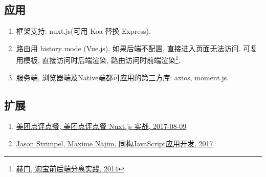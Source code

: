 \subsection{应用}\label{ux5e94ux7528}

\begin{enumerate}
\def\labelenumi{\arabic{enumi}.}
\tightlist
\item
  框架支持: nuxt.js(可用 Koa 替换 Express).
\item
  路由用 history mode (Vue.js), 如果后端不配置, 直接进入页面无法访问.
  可复用模板, 直接访问时后端渲染, 路由访问时前端渲染\footnote{\href{http://2014.jsconf.cn/slides/herman-taobaoweb/\#/}{赫门,
    淘宝前后端分离实践, 2014}}.
\item
  服务端, 浏览器端及Native端都可应用的第三方库: axios, moment.js.
\end{enumerate}

\subsection{扩展}\label{ux6269ux5c55}

\begin{enumerate}
\def\labelenumi{\arabic{enumi}.}
\tightlist
\item
  \href{https://juejin.im/post/598aabe96fb9a03c335a8dde}{美团点评点餐,
  美团点评点餐 Nuxt.js 实战, 2017-08-09}
\item
  \href{https://book.douban.com/subject/27183584/}{Jason Strimpel,
  Maxime Najim, 同构JavaScript应用开发, 2017}
\end{enumerate}
